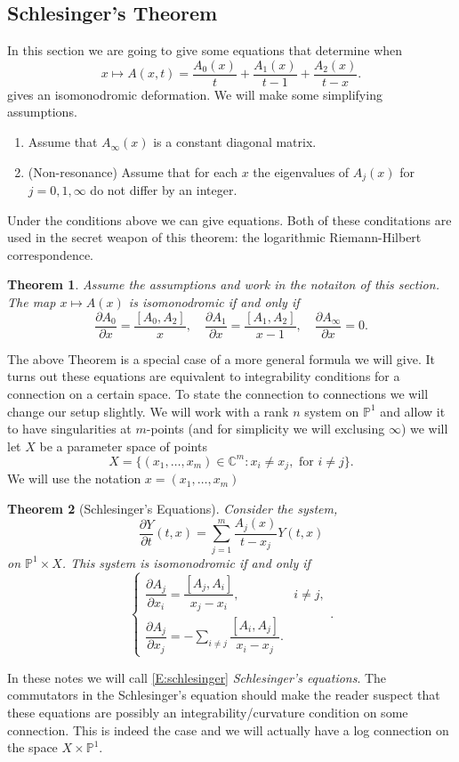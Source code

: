 \documentclass[12pt]{book}
\numberwithin{equation}{section}
\newtheorem{theorem}{Theorem}[subsection]
\theoremstyle{definition}
\theoremstyle{remark}
\newcommand{\CC}{\mathbb{C}}
\newcommand{\PP}{\mathbb{P}}
\begin{document}
\subsection{Schlesinger's Theorem}
In this section we are going to give some equations that determine when 
\begin{equation}
x\mapsto A(x,t) = \dfrac{A_0(x)}{t} +\dfrac{A_1(x)}{t-1} + \dfrac{A_2(x)}{t-x}.
\end{equation}
gives an isomonodromic deformation.
We will make some simplifying assumptions. 
\begin{enumerate}
	\item Assume that $A_{\infty}(x)$ is a constant diagonal matrix.
	\item (Non-resonance) Assume that for each $x$ the eigenvalues of $A_j(x)$ for $j=0,1,\infty$ do not differ by an integer. 
\end{enumerate}
Under the conditions above we can give equations.
Both of these conditations are used in the secret weapon of this theorem: the logarithmic Riemann-Hilbert correspondence. 
\begin{theorem}
	Assume the assumptions and work in the notaiton of this section.
	The map $x\mapsto A(x)$ is isomonodromic if and only if 
	$$\dfrac{\partial A_0}{\partial x} = \dfrac{[A_0,A_2]}{x}, \quad \dfrac{\partial A_1}{\partial x} = \dfrac{[A_1,A_2]}{x-1}, \quad \dfrac{\partial A_{\infty}}{\partial x}=0.$$
\end{theorem}
The above Theorem is a special case of a more general formula we will give. 
It turns out these equations are equivalent to integrability conditions for a connection on a certain space. 
To state the connection to connections we will change our setup slightly. 
We will work with a rank $n$ system on $\PP^1$ and allow it to have singularities at $m$-points (and for simplicity we will exclusing $\infty$) we will let $X$ be a parameter space of points
 $$ X = \lbrace (x_1,\ldots, x_m) \in \CC^m \colon x_i \neq x_j, \mbox{ for } i\neq j \rbrace .$$
We will use the notation $x=(x_1,\ldots,x_m)$
\begin{theorem}[Schlesinger's Equations]
	Consider the system, 
	 $$ \dfrac{\partial Y}{
	 \partial t}(t,x) = \sum_{j=1}^m \dfrac{A_j(x)}{t-x_j} Y(t,x)$$
 	on $\PP^1\times X$.
 	This system is isomonodromic if and only if 
 	\begin{equation}\label{E:schlesinger}
 	\begin{cases}
 	 \dfrac{\partial A_j}{\partial x_i} = \dfrac{[A_j,A_i]}{x_j-x_i}, &  i \neq j,\\ 
 	  \dfrac{\partial A_j}{\partial x_j} = -\sum_{i\neq j}\dfrac{[A_i,A_j]}{x_i-x_j}.
 	  \end{cases}.
 	 \end{equation}
\end{theorem}
In these notes we will call \eqref{E:schlesinger} \emph{Schlesinger's equations}.
The commutators in the Schlesinger's equation should make the reader suspect that these equations are possibly an integrability/curvature condition on some connection. 
This is indeed the case and we will actually have a log connection on the space $X\times \PP^1$.
\end{document}
